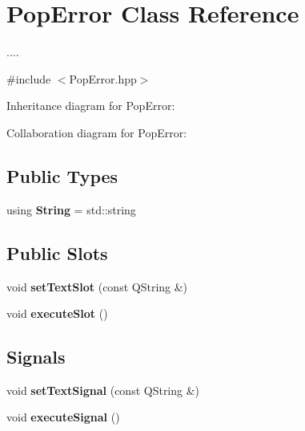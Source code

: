 \hypertarget{classPopError}{}\section{Pop\+Error Class Reference}
\label{classPopError}


....  




{\ttfamily \#include $<$Pop\+Error.\+hpp$>$}



Inheritance diagram for Pop\+Error\+:


Collaboration diagram for Pop\+Error\+:
\subsection*{Public Types}
\begin{DoxyCompactItemize}
\item 
using {\bfseries String} = std\+::string\hypertarget{classPopError_a10f9b6cbf4bae9b9dd5226950c1a36be}{}\label{classPopError_a10f9b6cbf4bae9b9dd5226950c1a36be}

\end{DoxyCompactItemize}
\subsection*{Public Slots}
\begin{DoxyCompactItemize}
\item 
void {\bfseries set\+Text\+Slot} (const Q\+String \&)\hypertarget{classPopError_ad4e97cc2e18d85d68a8e2eab8c6c6261}{}\label{classPopError_ad4e97cc2e18d85d68a8e2eab8c6c6261}

\item 
void {\bfseries execute\+Slot} ()\hypertarget{classPopError_a083b9ed8c271233a26b0551bfb505393}{}\label{classPopError_a083b9ed8c271233a26b0551bfb505393}

\end{DoxyCompactItemize}
\subsection*{Signals}
\begin{DoxyCompactItemize}
\item 
void {\bfseries set\+Text\+Signal} (const Q\+String \&)\hypertarget{classPopError_af60b7e6052b6acdb4fb9d3b1897beff3}{}\label{classPopError_af60b7e6052b6acdb4fb9d3b1897beff3}

\item 
void {\bfseries execute\+Signal} ()\hypertarget{classPopError_a27399d28bccf522da4b51d5fbf230f23}{}\label{classPopError_a27399d28bccf522da4b51d5fbf230f23}

\end{DoxyCompactItemize}

